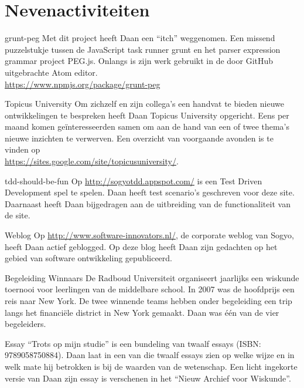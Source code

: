 \section*{Nevenactiviteiten}

	\begin{subActivityList}
		\item[grunt-peg] Met dit project heeft Daan een
		``itch'' weggenomen. Een missend puzzelstukje tussen
		de JavaScript task runner grunt en het parser
		expression grammar project PEG.js.
		Onlangs is zijn werk gebruikt in de door GitHub
		uitgebrachte Atom editor.\\
		\url{https://www.npmjs.org/package/grunt-peg}

		\item[Topicus University] Om zichzelf en zijn collega's een handvat te
		bieden nieuwe ontwikkelingen te bespreken heeft Daan Topicus University
		opgericht. Eens per maand komen ge\"interesseerden samen om aan de hand
		van een of twee thema's nieuwe inzichten te verwerven. Een overzicht
		van voorgaande avonden is te vinden op\\
		\url{https://sites.google.com/site/topicusuniversity/}.\hfill\\

		\item[tdd-should-be-fun] Op \url{http://sogyotdd.appspot.com/} is een
		Test Driven Development spel te spelen. Daan heeft test scenario's
		geschreven voor deze site. Daarnaast heeft Daan bijgedragen aan de
		uitbreiding van de functionaliteit van de site.\hfill\\

		\item[Weblog] Op \url{http://www.software-innovators.nl/}, de corporate
		weblog van Sogyo, heeft Daan actief geblogged. Op deze blog heeft
		Daan zijn gedachten op het gebied van software ontwikkeling gepubliceerd.
		\hfill\\

		\item[Begeleiding Winnaars] De Radboud Universiteit organiseert
		jaarlijks een wiskunde toernooi voor leerlingen van de middelbare
		school. In 2007 was de hoofdprijs een reis naar New York. De twee
		winnende teams hebben onder begeleiding een trip langs het financi\"ele
		district in New York gemaakt. Daan was \'e\'en van de vier begeleiders.
		\hfill\\

		\item[Essay] ``Trots op mijn studie'' is een bundeling van twaalf essays
		(ISBN: 9789058750884). Daan laat in een van die twaalf essays zien op
		welke wijze en in welk mate hij betrokken is bij de waarden van de
		wetenschap.
		Een licht ingekorte versie van Daan zijn essay is verschenen in het
		``Nieuw Archief voor Wiskunde''.
		\hfill\\
	\end{subActivityList}
